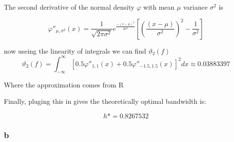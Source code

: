 \documentclass[11pt]{article}
\begin{document}
The second derivative of the normal density $\varphi$ with mean $\mu$ variance $\sigma^2$ is 

$$\varphi''_{\mu, \sigma^2}(x) = \frac{1}{\sqrt{2 \pi \sigma^2 }}e^{\frac{-(x-\mu)^2}{2\sigma^2}} \left[ \left( \frac{(x - \mu)}{\sigma^2} \right)^2 - \frac{1}{\sigma^2} \right]
$$

now useing the linearity of integrals we can find $\vartheta_{2}(f)$
$$ \vartheta_{2}(f) = \int_{-\infty}^{\infty} [0.5 \varphi''_{1,1}(x) + 0.5 \varphi''_{-1.5, 1.5}(x)]^2dx \approx 0.03883397
$$

Where the approximation comes from R 

Finally, pluging this in gives the theoretically optimal bandwidth is: 

$$h* = 0.8267532
$$

\subsubsection{b}

\end{document}
